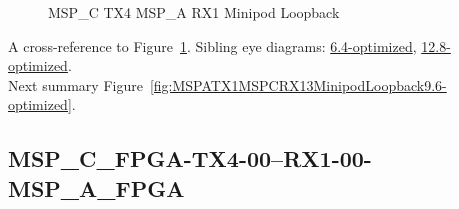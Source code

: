 \begin{figure}[h]
\begin{subfigure}{0.33\textwidth}
\hyperref[sec:MSPCFPGATX406RX106MSPAFPGA9.6-optimized]{}
\end{subfigure}\hspace*{\fill}
\begin{subfigure}{0.33\textwidth}
\hyperref[sec:MSPCFPGATX407RX107MSPAFPGA9.6-optimized]{}
\end{subfigure}\hspace*{\fill}
\begin{subfigure}{0.33\textwidth}
\hyperref[sec:MSPCFPGATX408RX108MSPAFPGA9.6-optimized]{}
\end{subfigure}

\begin{subfigure}{0.33\textwidth}
\hyperref[sec:MSPCFPGATX409RX109MSPAFPGA9.6-optimized]{}
\end{subfigure}\hspace*{\fill}
\begin{subfigure}{0.33\textwidth}
\hyperref[sec:MSPCFPGATX410RX110MSPAFPGA9.6-optimized]{}
\end{subfigure}\hspace*{\fill}
\begin{subfigure}{0.33\textwidth}
\hyperref[sec:MSPCFPGATX411RX111MSPAFPGA9.6-optimized]{}
\end{subfigure}

\caption{MSP\_C TX4 MSP\_A RX1 Minipod Loopback} \label{fig:MSPCTX4MSPARX1MinipodLoopback9.6-optimized}
\end{figure}

A cross-reference to Figure~\ref{fig:MSPCTX4MSPARX1MinipodLoopback9.6-optimized}.
Sibling eye diagrams: \hyperref[sec:MSPCTX4MSPARX1MinipodLoopback6.4-optimized]{6.4-optimized}, \hyperref[sec:MSPCTX4MSPARX1MinipodLoopback12.8-optimized]{12.8-optimized}. \\
Next summary Figure~\ref{fig:MSPATX1MSPCRX13MinipodLoopback9.6-optimized}.
\clearpage
% 
\subsection{MSP\_C\_FPGA-TX4-00--RX1-00-MSP\_A\_FPGA}\label{sec:MSPCFPGATX400RX100MSPAFPGA9.6-optimized}

